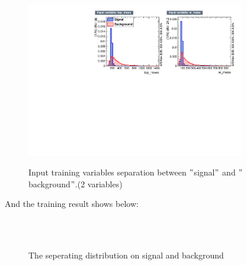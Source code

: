 			\begin{figure}[H]
			\centering{}
    			\includegraphics[width=0.85\textwidth]{Figures/EventSelReco/mva/a04_VarSep.pdf}\\
			\caption{Input training variables separation between $"$signal$"$ and $"$background$"$.(2 variables)}
			\label{EventSelReco:fig:a04_varsep}
			\end{figure}
			\FloatBarrier

			And the training result shows below:

			\begin{figure}[H]
			\centering
			    \\
			    \\
			\caption{The seperating distribution on signal and background}
			\label{EventSelReco:fig:Sep_a04}
			\end{figure}
			\FloatBarrier

